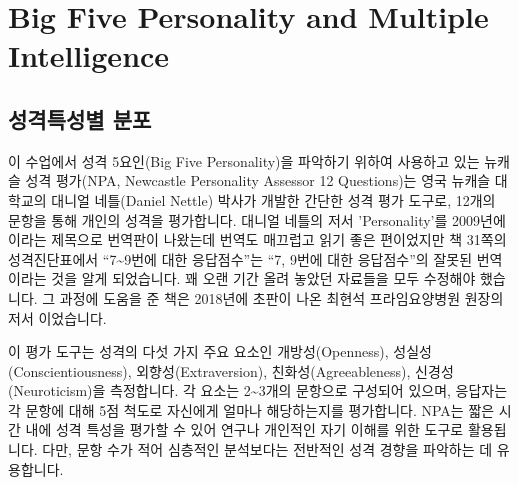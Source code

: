 \documentclass[
]{book}
\begin{document}
\chapter{Big Five Personality and Multiple Intelligence}\label{big-five-personality-and-multiple-intelligence-1}

\section{성격특성별 분포}\label{uxc131uxaca9uxd2b9uxc131uxbcc4-uxbd84uxd3ec-1}

이 수업에서 성격 5요인(Big Five Personality)을 파악하기 위하여 사용하고 있는 뉴캐슬 성격 평가(NPA, Newcastle Personality Assessor 12 Questions)는 영국 뉴캐슬 대학교의 대니얼 네틀(Daniel Nettle) 박사가 개발한 간단한 성격 평가 도구로, 12개의 문항을 통해 개인의 성격을 평가합니다. 대니얼 네틀의 저서 'Personality'를 2009년에 이라는 제목으로 번역판이 나왔는데 번역도 매끄럽고 읽기 좋은 편이었지만 책 31쪽의 성격진단표에서 ``7\textasciitilde9번에 대한 응답점수''는 ``7, 9번에 대한 응답점수''의 잘못된 번역이라는 것을 알게 되었습니다. 꽤 오랜 기간 올려 놓았던 자료들을 모두 수정해야 했습니다. 그 과정에 도움을 준 책은 2018년에 초판이 나온 최현석 프라임요양병원 원장의 저서 이었습니다.

이 평가 도구는 성격의 다섯 가지 주요 요소인 개방성(Openness), 성실성(Conscientiousness), 외향성(Extraversion), 친화성(Agreeableness), 신경성(Neuroticism)을 측정합니다. 각 요소는 2\textasciitilde3개의 문항으로 구성되어 있으며, 응답자는 각 문항에 대해 5점 척도로 자신에게 얼마나 해당하는지를 평가합니다.
NPA는 짧은 시간 내에 성격 특성을 평가할 수 있어 연구나 개인적인 자기 이해를 위한 도구로 활용됩니다. 다만, 문항 수가 적어 심층적인 분석보다는 전반적인 성격 경향을 파악하는 데 유용합니다.
\end{document}
